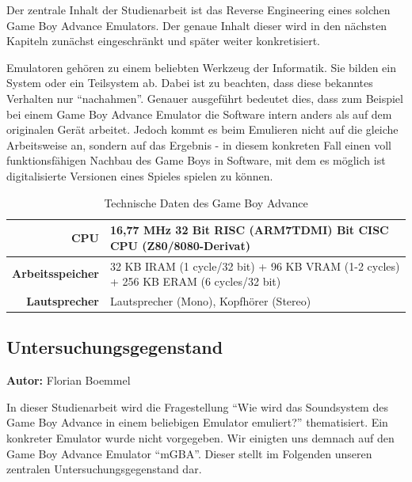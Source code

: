 \documentclass[11pt,a4paper]{scrartcl}
\newcommand{\AutorFlorian} {
    \vspace{-4mm}
    \large \textbf{Autor:} Florian Boemmel \normalsize
    \vspace{2mm}
}
\begin{document}
Der zentrale Inhalt der Studienarbeit ist das Reverse Engineering eines solchen Game Boy Advance Emulators. Der genaue Inhalt dieser wird in den n\"achsten Kapiteln zun\"achst eingeschr\"ankt und sp\"ater weiter konkretisiert.

Emulatoren geh\"oren zu einem beliebten Werkzeug der Informatik. Sie bilden ein System oder ein Teilsystem ab. Dabei ist zu beachten, dass diese bekanntes Verhalten nur \enquote{nachahmen}. Genauer ausgef\"uhrt bedeutet dies, dass zum Beispiel bei einem Game Boy Advance Emulator die Software intern anders als auf dem originalen Ger\"at arbeitet. Jedoch kommt es beim Emulieren nicht auf die gleiche Arbeitsweise an, sondern auf das Ergebnis - in diesem konkreten Fall einen voll funktionsf\"ahigen Nachbau des Game Boys in Software, mit dem es m\"oglich ist digitalisierte Versionen eines Spieles spielen zu k\"onnen.\newline

\begin{table}[h]
    \centering
    \begin{tabular}{ r | p{10cm} }
        \textbf{CPU} & 16,77 MHz 32 Bit RISC (ARM7TDMI)\newline
              8 Bit CISC CPU (Z80/8080-Derivat) \\
        \hline
        \textbf{Arbeitsspeicher} & 32 KB IRAM (1 cycle/32 bit)\newline
                          + 96 KB VRAM (1-2 cycles)\newline
                          + 256 KB ERAM (6 cycles/32 bit) \\
        \hline
        \textbf{Lautsprecher} & Lautsprecher (Mono), Kopfh\"orer (Stereo) \\
    \end{tabular}
    \caption{Technische Daten des Game Boy Advance \cite{GameBoyTechnischeDaten}}
    \label{table:TechnischeDaten}
\end{table}

\newpage

\subsection{Untersuchungsgegenstand}
\AutorFlorian

In dieser Studienarbeit wird die Fragestellung \enquote{Wie wird das Soundsystem des Game Boy Advance in einem beliebigen Emulator emuliert?} thematisiert. Ein konkreter Emulator wurde nicht vorgegeben. Wir einigten uns demnach auf den Game Boy Advance Emulator \enquote{mGBA}. Dieser stellt im Folgenden unseren zentralen Untersuchungsgegenstand dar.
\end{document}
